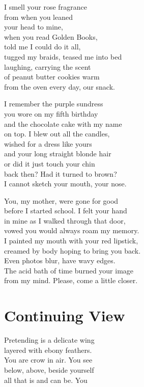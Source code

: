 \documentclass[twoside,10pt]{book}
\begin{document}
I smell your rose fragrance\\
from when you leaned\\
your head to mine,\\
when you read Golden Books,\\
told me I could do it all,\\
tugged my braids, teased me into bed\\
laughing, carrying the scent\\
of peanut butter cookies warm\\
from the oven every day, our snack.

I remember the purple sundress\\
you wore on my fifth birthday\\
and the chocolate cake with my name\\
on top. I blew out all the candles,\\
wished for a dress like yours\\
and your long straight blonde hair\\
or did it just touch your chin\\
back then? Had it turned to brown?\\
I cannot sketch your mouth, your nose.

You, my mother, were gone for good\\
before I started school. I felt your hand\\
in mine as I walked through that door,\\
vowed you would always roam my memory.\\
I painted my mouth with your red lipstick,\\
creamed by body hoping to bring you back.\\
Even photos blur, have wavy edges.\\
The acid bath of time burned your image\\
from my mind. Please, come a little closer.


\clearpage
\section{Continuing View}

Pretending is a delicate wing\\
layered with ebony feathers.\\
You are crow in air. You see\\
below, above, beside yourself\\
all that is and can be. You
\end{document}
